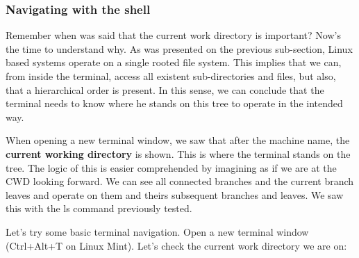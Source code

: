 \documentclass[a4paper,11pt]{article}
\begin{document}
\subsubsection{Navigating with the shell}
Remember when was said that the current work directory is important? Now's the
time to understand why. As was presented on the previous sub-section, Linux based
systems operate on a single rooted file system. This implies that we can, from 
inside the terminal, access all existent sub-directories and files, but also,
that a hierarchical order is present. In this sense, we can conclude that the
terminal needs to know where he stands on this tree to operate in the intended
way.\par
When opening a new terminal window, we saw that after the machine name, the
\textbf{current working directory} is shown. This is where the terminal
stands on the tree. The logic of this is easier comprehended by
imagining as if we are at the CWD looking forward. We can see all connected
branches and the current branch leaves and operate on them and theirs
subsequent branches and leaves. We saw this with the ls command previously
tested. \par
Let's try some basic terminal navigation. Open a new terminal window (Ctrl+Alt+T on
Linux Mint). Let's check the current work directory we are on:
\end{document}
